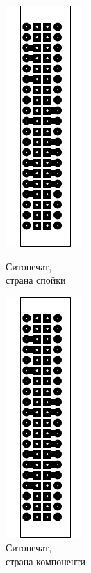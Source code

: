 \begin{figure}[!htbp]
    \begin{minipage}{0.49\linewidth}
        \centering
        \includegraphics[page=3]{documents/dev_board.pdf}
        \caption{Ситопечат,\\страна спойки}
        \label{fig:dev_top_silk}
    \end{minipage}
    \hfill
    \begin{minipage}{0.49\linewidth}
        \centering
        \includegraphics[page=4]{documents/dev_board.pdf}
        \caption{Ситопечат,\\страна компоненти}
        \label{fig:dev_bot_silk}
    \end{minipage}
\end{figure}
